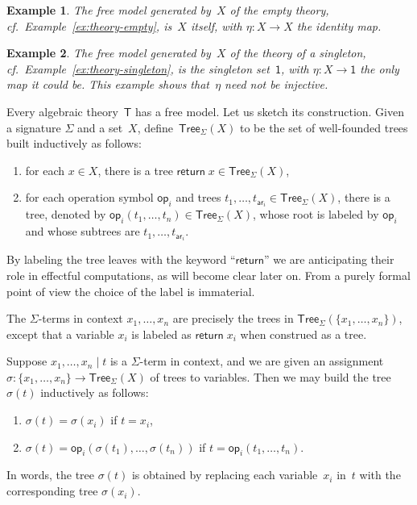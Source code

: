 \documentclass{amsart}
\newcommand{\theory}[1]{\mathsf{#1}} %
\newcommand{\set}[1]{\{#1\}} %
\newcommand{\Tree}[2]{\mathsf{Tree}_{#1}(#2)} %
\newcommand{\leaf}[1]{\return{#1}} %
\newcommand{\op}[1]{\mathsf{op}_{#1}} %
\newcommand{\arity}[1]{\mathsf{ar}_{#1}} %
\newcommand{\one}{\mathsf{1}} %
\newcommand{\kode}[1]{\mathsf{#1}}
\newcommand{\return}[1]{\kode{return}\;#1}
\newtheorem{example}{Example}[section]
\begin{document}
\begin{example}
  The free model generated by~$X$ of the empty theory, cf.\ Example~\ref{ex:theory-empty},
  is~$X$ itself, with $\eta : X \to X$ the identity map.
\end{example}

\begin{example}
  The free model generated by~$X$ of the theory of a singleton, cf.\
  Example~\ref{ex:theory-singleton}, is the singleton set~$\one$, with $\eta : X \to \one$
  the only map it could be. This example shows that~$\eta$ need not be injective.
\end{example}

Every algebraic theory~$\theory{T}$ has a free model. Let us sketch its
construction. Given a signature $\Sigma$ and a set~$X$,
define~$\Tree{\Sigma}{X}$ to be the set of well-founded trees built inductively
as follows:
%
\begin{enumerate}
\item for each $x \in X$, there is a tree $\leaf{x} \in \Tree{\Sigma}{X}$,
\item for each operation symbol $\op{i}$ and trees
  $t_1, \ldots, t_{\arity{i}} \in \Tree{\Sigma}{X}$, there is a tree, denoted by
  $\op{i}(t_1, \ldots, t_n) \in \Tree{\Sigma}{X}$, whose root is labeled by
  $\op{i}$ and whose subtrees are $t_1, \ldots, t_{\arity{i}}$.
\end{enumerate}
%
By labeling the tree leaves with the keyword ``$\mathsf{return}$'' we are
anticipating their role in effectful computations, as will become clear later
on. From a purely formal point of view the choice of the label is immaterial.

The $\Sigma$-terms in context $x_1, \ldots, x_n$ are precisely the trees in
$\Tree{\Sigma}{\set{x_1, \ldots, x_n}}$, except that a variable $x_i$ is labeled
as $\leaf{x_i}$ when construed as a tree.

Suppose $x_1, \ldots, x_n \mid t$ is a $\Sigma$-term in context, and we are
given an assignment $\sigma : \set{x_1, \ldots, x_n} \to \Tree{\Sigma}{X}$ of
trees to variables. Then we may build the tree $\sigma(t)$ inductively as
follows:
%
\begin{enumerate}
\item $\sigma(t) = \sigma(x_i)$ if $t = x_i$,
\item $\sigma(t) = \op{i}(\sigma(t_1), \ldots, \sigma(t_n))$ if
  $t = \op{i}(t_1, \ldots, t_n)$.
\end{enumerate}
%
In words, the tree $\sigma(t)$ is obtained by replacing each variable~$x_i$ in~$t$ with
the corresponding tree $\sigma(x_i)$.
\end{document}
